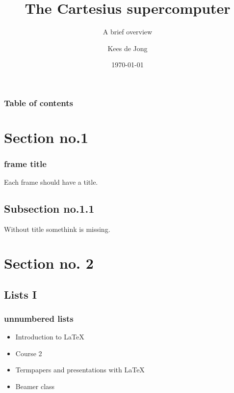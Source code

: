 \documentclass[hyperref={pdfpagelabels=false},aspectratio=169]{beamer}
\title{The Cartesius supercomputer}
\subtitle{A brief overview}
\author{Kees de Jong}
\institute[SURFsara]{MSc System and Network Engineering\par System administrator of Cartesius}
\date{\today}
\begin{document}
    \begin{frame}
        \titlepage
    \end{frame}


    \begin{frame}
        \frametitle{Table of contents}
        \tableofcontents
    \end{frame} 

    \section{Section no.1} 
    \begin{frame}
        \frametitle{frame title} 
        Each frame should have a title.
    \end{frame}
    \subsection{Subsection no.1.1  }
    \begin{frame}
        Without title somethink is missing. 
    \end{frame}


    \section{Section no. 2} 
    \subsection{Lists I}
    \begin{frame}
        \frametitle{unnumbered lists}
        \begin{itemize}
            \item Introduction to  \LaTeX{}  
            \item Course 2 
            \item Termpapers and presentations with \LaTeX{}  
            \item Beamer class
        \end{itemize} 
    \end{frame}
\end{document}
